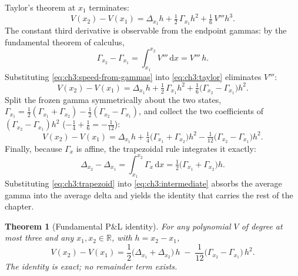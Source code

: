 \documentclass[11pt]{book}
\theoremstyle{plain}
\newtheorem{theorem}{Theorem}[chapter]
\theoremstyle{definition}
\theoremstyle{remark}
\newcommand{\dd}{\mathrm{d}}                                  %
\begin{document}
Taylor's theorem at $x_1$ terminates:
\begin{equation}\label{eq:ch3:taylor}
  V(x_2) - V(x_1)
  = \Delta_{x_1} h + \tfrac{1}{2}\,\Gamma_{x_1} h^2 + \tfrac{1}{6}\,V''' h^3 .
\end{equation}
The constant third derivative is observable from the endpoint gammas: by the
fundamental theorem of calculus,
\begin{equation}\label{eq:ch3:speed-from-gammas}
  \Gamma_{x_2} - \Gamma_{x_1} = \int_{x_1}^{x_2} V'''\,\dd x = V'''\,h .
\end{equation}
Substituting \eqref{eq:ch3:speed-from-gammas} into \eqref{eq:ch3:taylor}
eliminates $V'''$:
\begin{equation}\label{eq:ch3:after-elimination}
  V(x_2) - V(x_1)
  = \Delta_{x_1} h + \tfrac{1}{2}\,\Gamma_{x_1} h^2
    + \tfrac{1}{6}\bigl(\Gamma_{x_2} - \Gamma_{x_1}\bigr) h^2 .
\end{equation}
Split the frozen gamma symmetrically about the two states,
$\Gamma_{x_1} = \tfrac{1}{2}(\Gamma_{x_1} + \Gamma_{x_2})
             - \tfrac{1}{2}(\Gamma_{x_2} - \Gamma_{x_1})$,
and collect the two coefficients of $(\Gamma_{x_2}-\Gamma_{x_1})h^2$
($-\tfrac{1}{4} + \tfrac{1}{6} = -\tfrac{1}{12}$):
\begin{equation}\label{eq:ch3:intermediate}
  V(x_2) - V(x_1)
  = \Delta_{x_1} h
    + \tfrac{1}{4}\bigl(\Gamma_{x_1} + \Gamma_{x_2}\bigr) h^2
    - \tfrac{1}{12}\bigl(\Gamma_{x_2} - \Gamma_{x_1}\bigr) h^2 .
\end{equation}
Finally, because $\Gamma_x$ is affine, the trapezoidal rule integrates it
exactly:
\begin{equation}\label{eq:ch3:trapezoid}
  \Delta_{x_2} - \Delta_{x_1}
  = \int_{x_1}^{x_2} \Gamma_x \,\dd x
  = \tfrac{1}{2}\bigl(\Gamma_{x_1} + \Gamma_{x_2}\bigr) h .
\end{equation}
Substituting \eqref{eq:ch3:trapezoid} into \eqref{eq:ch3:intermediate}
absorbs the average gamma into the average delta and yields the identity that
carries the rest of the chapter.

\begin{theorem}[Fundamental P\&L identity]\label{thm:ch3:fundamental}
For any polynomial $V$ of degree at most three and any
$x_1, x_2 \in \mathbb{R}$, with $h = x_2 - x_1$,
\begin{equation}\label{eq:ch3:fundamental}
  \boxed{\;
  V(x_2) - V(x_1)
  = \frac{1}{2}\bigl(\Delta_{x_1} + \Delta_{x_2}\bigr)\, h
  \;-\; \frac{1}{12}\bigl(\Gamma_{x_2} - \Gamma_{x_1}\bigr)\, h^2 .
  \;}
\end{equation}
The identity is exact; no remainder term exists.
\end{theorem}
\end{document}
